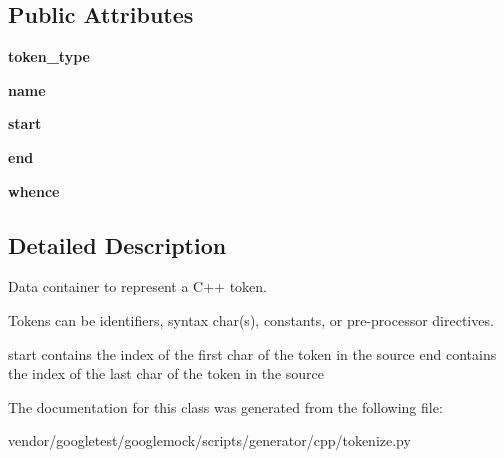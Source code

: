 \subsection*{Public Attributes}
\begin{DoxyCompactItemize}
\item 
{\bfseries token\+\_\+type}\hypertarget{classcpp_1_1tokenize_1_1Token_a60c6e5120f3947885f10788ceb69a660}{}\label{classcpp_1_1tokenize_1_1Token_a60c6e5120f3947885f10788ceb69a660}

\item 
{\bfseries name}\hypertarget{classcpp_1_1tokenize_1_1Token_a90859dd16bde71bc38f717f5119e63b9}{}\label{classcpp_1_1tokenize_1_1Token_a90859dd16bde71bc38f717f5119e63b9}

\item 
{\bfseries start}\hypertarget{classcpp_1_1tokenize_1_1Token_a8ec48e348ff29901857cb21553da464b}{}\label{classcpp_1_1tokenize_1_1Token_a8ec48e348ff29901857cb21553da464b}

\item 
{\bfseries end}\hypertarget{classcpp_1_1tokenize_1_1Token_a9935738c382352eca19834c2533715db}{}\label{classcpp_1_1tokenize_1_1Token_a9935738c382352eca19834c2533715db}

\item 
{\bfseries whence}\hypertarget{classcpp_1_1tokenize_1_1Token_a9d3a8011707ede6be85987d74f88848d}{}\label{classcpp_1_1tokenize_1_1Token_a9d3a8011707ede6be85987d74f88848d}

\end{DoxyCompactItemize}


\subsection{Detailed Description}
\begin{DoxyVerb}Data container to represent a C++ token.

Tokens can be identifiers, syntax char(s), constants, or
pre-processor directives.

start contains the index of the first char of the token in the source
end contains the index of the last char of the token in the source
\end{DoxyVerb}
 

The documentation for this class was generated from the following file\+:\begin{DoxyCompactItemize}
\item 
vendor/googletest/googlemock/scripts/generator/cpp/tokenize.\+py\end{DoxyCompactItemize}

